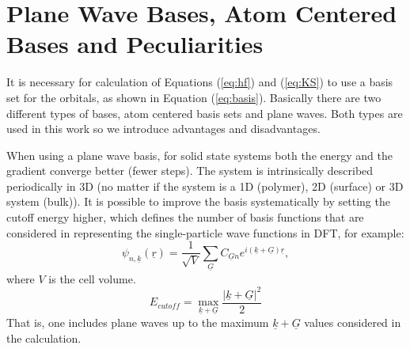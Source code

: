 \documentclass[11pt,DIV=13,BCOR=5mm,a4paper,headinclude]{scrbook}
\renewcommand{\vec}[1]{\underline{#1}}
\def\doubleunderline#1{\underline{\underline{#1}}}
\begin{document}
% 




\section{Plane Wave Bases, Atom Centered Bases and Peculiarities}
It is necessary for calculation of Equations (\ref{eq:hf}) and (\ref{eq:KS}) to use a basis set for the orbitals, as shown in Equation (\ref{eq:basis}).
Basically there are two different types of bases, atom centered basis sets and plane waves.
Both types are used in this work so we introduce advantages and disadvantages\cite{Tosoni2007}.

When using a plane wave basis, for solid state systems both the energy and the gradient converge better (fewer steps).
The system is intrinsically described periodically in 3D (no matter if the system is a 1D (polymer), 2D (surface) or 3D system (bulk)).
It is possible to improve the basis systematically by setting the cutoff energy higher, which defines the number of basis functions that are considered in representing the single-particle wave functions in DFT, for example:
\begin{equation}
 \psi_{n,\vec{k}}(\vec{r})=\frac{1}{\sqrt{V}}\sum_{\vec{G}}C_{\vec{G}n}e^{i(\vec{k}+\vec{G})\vec{r}},
\end{equation}
where $V$ is the cell volume.
\begin{equation}
 E_{cutoff}=\max_{\vec{k}+\vec{G}}\frac{|\vec{k}+\vec{G}|^2}{2}
\end{equation}
That is, one includes plane waves up to the maximum $\vec{k}+\vec{G}$ values considered in the calculation.
\end{document}
